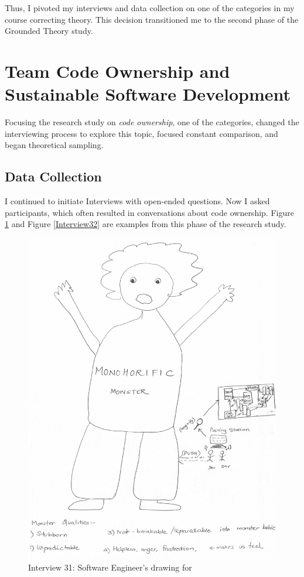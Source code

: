 Thus, I pivoted my interviews and data collection on  one of the categories in my course correcting theory. This decision transitioned me to the second phase of the Grounded Theory study.
\section{Team Code Ownership and Sustainable Software Development}
\label{TeamCodeOwnershipAndSustainableSoftwareDevelopment}

Focusing the research study on \textit{code ownership}, one of the categories, changed the interviewing process to explore this topic, focused constant comparison, and began theoretical sampling. 

\subsection{Data Collection}
I continued to initiate Interviews with open-ended questions. Now I asked participants,  which often resulted in conversations about code ownership. Figure \ref{Interview31} and Figure \ref{Interview32} are examples from this phase of the research study. 

\begin{figure}[htbp]
\centering
\includegraphics[width=\oneColumnWidth{}]{drawings/2016_09_26.png}
\caption{Interview 31: Software Engineer's drawing for }
\label{Interview31}
\end{figure}

